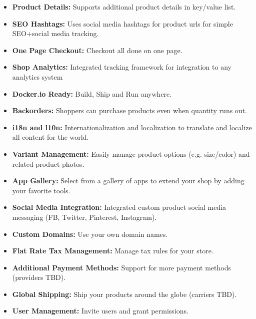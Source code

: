 \begin{itemize}
	\item \textbf{ Product Details:} Supports additional product details in key/value list.
	
	\item \textbf{ SEO Hashtags:} Uses social media hashtags for product urls for simple SEO+social media tracking.
	
	\item \textbf{ One Page Checkout:} Checkout all done on one page.
	
	\item \textbf{ Shop Analytics:} Integrated tracking framework for integration to any analytics system
	
	\item \textbf{ Docker.io Ready:} Build, Ship and Run anywhere.
	
	\item \textbf{ Backorders:} Shoppers can purchase products even when quantity runs out.
	
	\item \textbf{ i18n and l10n:} Internationalization and localization to translate and localize all content for the world.
	
	\item \textbf{ Variant Management:} Easily manage product options (e.g. size/color) and related product photos.
	
	\item \textbf{ App Gallery:} Select from a gallery of apps to extend your shop by adding your favorite tools.
	
	\item \textbf{ Social Media Integration:} Integrated custom product social media messaging (FB, Twitter, Pinterest, Instagram).
	
	\item \textbf{ Custom Domains:} Use your own domain names.
	
	\item \textbf{ Flat Rate Tax Management:} Manage tax rules for your store.
	
	\item \textbf{ Additional Payment Methods:} Support for more payment methods (providers TBD).
	
	\item \textbf{ Global Shipping:} Ship your products around the globe (carriers TBD).
	
	\item \textbf{ User Management:} Invite users and grant permissions.
	

\end{itemize}
